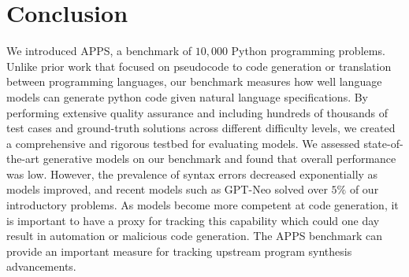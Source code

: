 \section{Conclusion}
We introduced APPS, a benchmark of $10,\!000$ Python programming problems. Unlike prior work that focused on pseudocode to code generation or translation between programming languages, our benchmark measures how well language models can generate python code given natural language specifications. By performing extensive quality assurance and including hundreds of thousands of test cases and ground-truth solutions across different difficulty levels, we created a comprehensive and rigorous testbed for evaluating models. We assessed state-of-the-art generative models on our benchmark and found that overall performance was low. However, the prevalence of syntax errors decreased exponentially as models improved, and recent models such as GPT-Neo solved over $5\%$ of our introductory problems. As models become more competent at code generation, it is important to have a proxy for tracking this capability which could one day result in automation or malicious code generation. The APPS benchmark can provide an important measure for tracking upstream program synthesis advancements.



